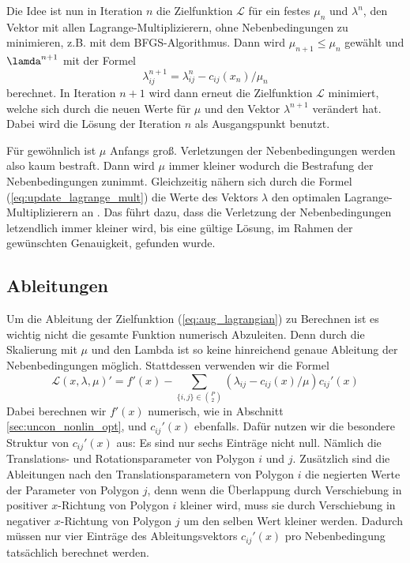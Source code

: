 \documentclass[runningheads,a4paper]{llncs}
\begin{document}
Die Idee ist nun in Iteration $n$ die Zielfunktion $\mathcal{L}$ für ein festes $\mu_n$ und $\lambda^n$, den Vektor mit allen Lagrange-Multiplizierern, ohne Nebenbedingungen zu minimieren, z.B. mit dem BFGS-Algorithmus. Dann wird ${\mu_{n+1} \le \mu_n}$ gewählt und $\lamda^{n+1}$ mit der Formel
\begin{equation}
\label{eq:update_lagrange_mult}
\lambda_{ij}^{n+1} = \lambda_{ij}^n - c_{ij}(x_n)/\mu_n 
\end{equation}
berechnet.
In Iteration $n+1$ wird dann erneut die Zielfunktion $\mathcal{L}$ minimiert, welche sich durch die neuen Werte für $\mu$ und den Vektor $\lambda^{n+1}$ verändert hat. Dabei wird die Lösung der Iteration $n$ als Ausgangspunkt benutzt.

Für gewöhnlich ist $\mu$ Anfangs groß. Verletzungen der Nebenbedingungen werden also kaum bestraft. Dann wird $\mu$ immer kleiner wodurch die Bestrafung der Nebenbedingungen zunimmt. Gleichzeitig nähern sich durch die Formel (\ref{eq:update_lagrange_mult}) die Werte des Vektors $\lambda$ den optimalen Lagrange-Multiplizierern an \cite{nocedal1999numerical}. Das führt dazu, dass die Verletzung der Nebenbedingungen letzendlich immer kleiner wird, bis eine gültige Lösung, im Rahmen der gewünschten Genauigkeit, gefunden wurde.

\subsection{Ableitungen}
Um die Ableitung der Zielfunktion (\ref{eq:aug_lagrangian}) zu Berechnen ist es wichtig nicht die gesamte Funktion numerisch Abzuleiten. Denn durch die Skalierung mit $\mu$ und den Lambda ist so keine hinreichend genaue Ableitung der Nebenbedingungen möglich. Stattdessen verwenden wir die Formel \cite{nocedal1999numerical}
\begin{equation*}
\mathcal{L}(x,\lambda,\mu)' = f'(x) - \sum_{\{i,j\}\in {P \choose 2}}(\lambda_{ij} - c_{ij}(x)/\mu) c_{ij}'(x)
\end{equation*}
Dabei berechnen wir $f'(x)$ numerisch, wie in Abschnitt \ref{sec:uncon_nonlin_opt}, und $c_{ij}'(x)$ ebenfalls. Dafür nutzen wir die besondere Struktur von $c_{ij}'(x)$ aus: Es sind nur sechs Einträge nicht null. Nämlich die Translations- und Rotationsparameter von Polygon $i$ und $j$. Zusätzlich sind die Ableitungen nach den Translationsparametern von Polygon $i$ die negierten Werte der Parameter von Polygon $j$, denn wenn die Überlappung durch Verschiebung in positiver $x$-Richtung von Polygon $i$ kleiner wird, muss sie durch Verschiebung in negativer $x$-Richtung von Polygon $j$ um den selben Wert kleiner werden. Dadurch müssen nur vier Einträge des Ableitungsvektors $c_{ij}'(x)$ pro Nebenbedingung tatsächlich berechnet werden.


{}

\end{document}
